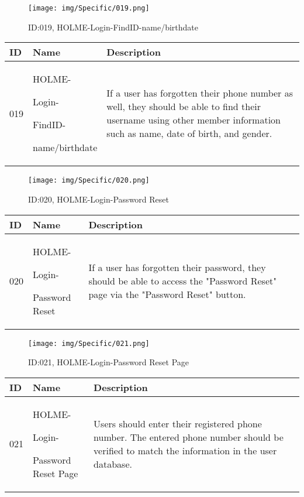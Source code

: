 \documentclass[conference]{IEEEtran}
\begin{document}
\begin{enumerate}
\begin{figure}[h]
\centering
\texttt{[image: img/Specific/019.png]}
\caption{ID:019, HOLME-Login-FindID-name/birthdate}
\end{figure}
\begin{table}[h]
\def\arraystretch{1.2} \small
    \begin{tabular}{|p{1cm}|p{1.8cm}|p{5.0cm}|}
        \hline
        ID & Name & Description\\ \hline
         019 \par  & HOLME-\par Login-\par FindID- \par name/birthdate &If a user has forgotten their phone number as well, they should be able to find their username using other member information such as name, date of birth, and gender.\\ \hline
    \end{tabular}
\end{table}

\begin{figure}[h]
\centering
\texttt{[image: img/Specific/020.png]}
\caption{ID:020, HOLME-Login-Password Reset}
\end{figure}
\begin{table}[h]
\def\arraystretch{1.2} \small
    \begin{tabular}{|p{1cm}|p{1.8cm}|p{5.0cm}|}
        \hline
        ID & Name & Description\\ \hline
         020 \par  & HOLME-\par Login-\par Password Reset &If a user has forgotten their password, they should be able to access the "Password Reset" page via the "Password Reset" button.\\ \hline
    \end{tabular}
\end{table}

\begin{figure}[h]
\centering
\texttt{[image: img/Specific/021.png]}
\caption{ID:021, HOLME-Login-Password Reset Page}
\end{figure}
\begin{table}[h]
\def\arraystretch{1.2} \small
    \begin{tabular}{|p{1cm}|p{1.8cm}|p{5.0cm}|}
        \hline
        ID & Name & Description\\ \hline
         021 \par  & HOLME-\par Login-\par Password Reset Page &Users should enter their registered phone number. The entered phone number should be verified to match the information in the user database.\\ \hline
    \end{tabular}
\end{table}
\clearpage


\end{enumerate}
\end{document}
